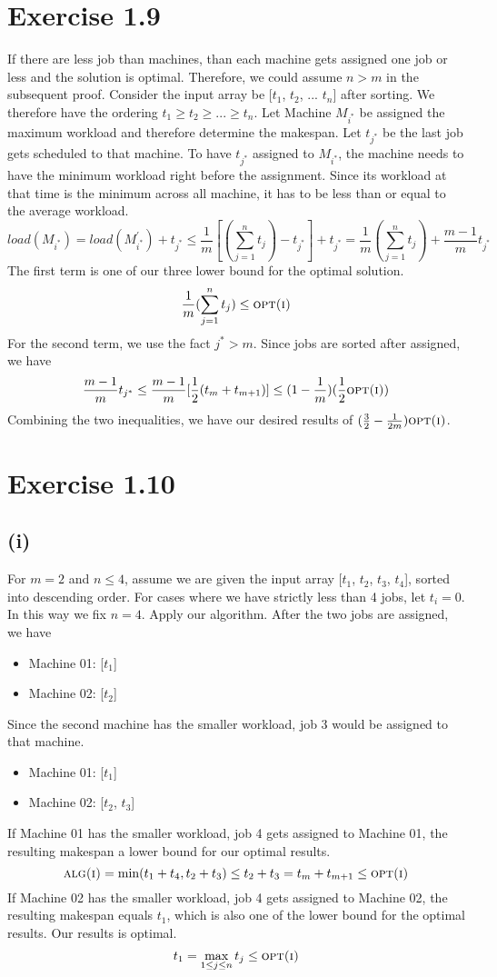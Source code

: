 \documentclass[11pt]{article}
\begin{document}
\section*{Exercise 1.9}
If there are less job than machines, than each machine gets assigned one job or less and the solution is optimal. Therefore, we could assume $n>m$ in the subsequent proof. 
\newline
Consider the input array be [$t_1$, $t_2$, ... $t_n$] after sorting. We therefore have the ordering $t_1 \geq t_2 \geq ... \geq t_n$.
Let Machine $M_{i^{*}}$ be assigned the maximum workload and therefore determine the makespan. Let $t_{j^{*}}$ be the last job gets scheduled to that machine. 
To have $t_{j^{*}}$ assigned to $M_{i^{*}}$, the machine needs to have the minimum workload right before the assignment. Since its workload at that time is the minimum across all machine, 
it has to be less than or equal to the average workload. 
\[ load(M_{i^{*}}) = load(M^{'}_{i^{*}}) + t_{j^{*}} \leq \frac{1}{m}[(\sum_{j=1}^{n}t_j) - t_{j^{*}}] + t_{j^{*}} = \frac{1}{m}(\sum_{j=1}^{n}t_j) + \frac{m-1}{m}t_{j^{*}}
\]
The first term is one of our three lower bound for the optimal solution. 
\[ \frac{1}{m}(\sum_{j=1}^{n}t_j) \leq \textsc{opt(i)}
\]
For the second term, we use the fact $j^* > m$. Since jobs are sorted after assigned, we have
\[ \frac{m-1}{m} t_{j^{*}} \leq \frac{m-1}{m} [\frac{1}{2}(t_{m} + t_{m+1})] \leq (1-\frac{1}{m})(\frac{1}{2}\textsc{opt(i)})
\]
Combining the two inequalities, we have our desired results of $(\frac{3}{2}-\frac{1}{2m})\textsc{opt(i)}$.

\section*{Exercise 1.10}
\subsection*{(i)} \noindent
For $m=2$ and $n\leq4$, assume we are given the input array [$t_1$, $t_2$, $t_3$, $t_4$], sorted into descending order. For cases where we have strictly less than 4 jobs, let $t_i = 0$.
In this way we fix $n=4$.
Apply our algorithm. After the two jobs are assigned, we have 
\begin{itemize}
  \item Machine 01: [$t_1$]
  \item Machine 02: [$t_2$]
\end{itemize}
Since the second machine has the smaller workload, job 3 would be assigned to that machine.
\begin{itemize}
  \item Machine 01: [$t_1$]
  \item Machine 02: [$t_2$, $t_3$]
\end{itemize}
If Machine 01 has the smaller workload, job 4 gets assigned to Machine 01, the resulting makespan a lower bound for our optimal results. 
\[\textsc{alg(i)} = \min(t_1+t_4, t_2+t_3) \leq t_2+t_3 = t_{m}+t_{m+1} \leq \textsc{opt(i)}
\]
If Machine 02 has the smaller workload, job 4 gets assigned to Machine 02, the resulting makespan equals $t_1$, which is also one of the lower bound for 
the optimal results. Our results is optimal.
\[t_1 =\max_{1 \leq j \leq n} t_j \leq \textsc{opt(i)}
\]
\end{document}
